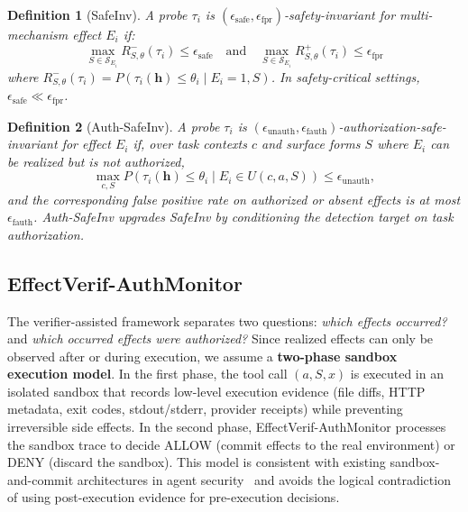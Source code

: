 \documentclass{article}
\newtheorem{definition}{Definition}[section]
\begin{document}
\begin{definition}[SafeInv]
A probe $\tau_i$ is $(\epsilon_{\text{safe}}, \epsilon_{\text{fpr}})$-\emph{safety-invariant} for multi-mechanism effect $E_i$ if:
$$\max_{S \in \mathcal{S}_{E_i}} R_{S, \theta}^{-}(\tau_i) \leq \epsilon_{\text{safe}} \quad \text{and} \quad \max_{S \in \mathcal{S}_{E_i}} R_{S, \theta}^{+}(\tau_i) \leq \epsilon_{\text{fpr}}$$
where $R_{S, \theta}^{-}(\tau_i) = P(\tau_i(\mathbf{h}) \leq \theta_i \mid E_i=1, S)$. In safety-critical settings, $\epsilon_{\text{safe}} \ll \epsilon_{\text{fpr}}$.
\end{definition}

\begin{definition}[Auth-SafeInv]
A probe $\tau_i$ is $(\epsilon_{\text{unauth}}, \epsilon_{\text{fauth}})$-\emph{authorization-safe-invariant} for effect $E_i$ if, over task contexts $c$ and surface forms $S$ where $E_i$ can be realized but is not authorized,
$$\max_{c,S} P(\tau_i(\mathbf{h}) \leq \theta_i \mid E_i \in U(c,a,S)) \leq \epsilon_{\text{unauth}},$$
and the corresponding false positive rate on authorized or absent effects is at most $\epsilon_{\text{fauth}}$. Auth-SafeInv upgrades SafeInv by conditioning the detection target on task authorization.
\end{definition}

\subsection{EffectVerif-AuthMonitor}

The verifier-assisted framework separates two questions: \emph{which effects occurred?} and \emph{which occurred effects were authorized?} Since realized effects can only be observed after or during execution, we assume a \textbf{two-phase sandbox execution model}. In the first phase, the tool call $(a,S,x)$ is executed in an isolated sandbox that records low-level execution evidence (file diffs, HTTP metadata, exit codes, stdout/stderr, provider receipts) while preventing irreversible side effects. In the second phase, Effect\-Verif-Auth\-Monitor processes the sandbox trace to decide ALLOW (commit effects to the real environment) or DENY (discard the sandbox). This model is consistent with existing sandbox-and-commit architectures in agent security~\cite{parallax2026,alignmentcontracts2026,eca2026} and avoids the logical contradiction of using post-execution evidence for pre-execution decisions.
\end{document}
